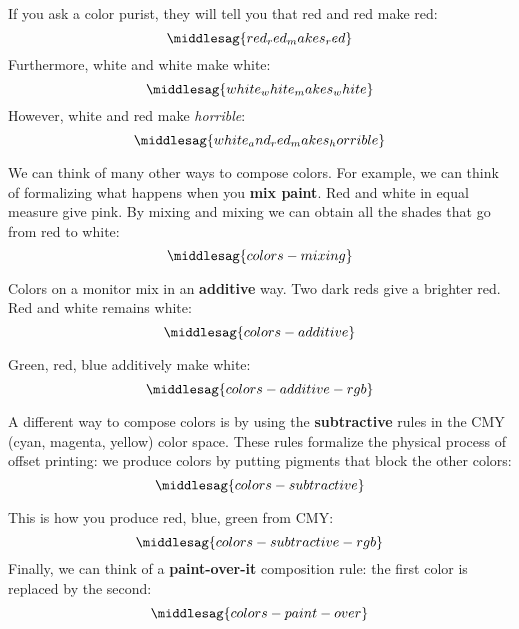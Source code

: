 If you ask a color purist, they will tell you that red and red make red:
%
\begin{equation}
    \middlesag{red_red_makes_red}
\end{equation}
%
Furthermore, white and white make white:
%
\begin{equation}
    \middlesag{white_white_makes_white}
\end{equation}
%
However, white and red make \emph{horrible}:
%
\begin{equation}
    \middlesag{white_and_red_makes_horrible}
\end{equation}


We can think of many other ways to compose colors.
For example, we can think of formalizing what happens when you \textbf{mix paint}.
Red and white in equal measure give pink.
By mixing and mixing we can obtain all the shades that go from red to white:
%
\begin{equation}
    \label{eq:colors-mixing}
    \middlesag{colors-mixing}
\end{equation}

Colors on a monitor mix in an \textbf{additive} way.
Two dark reds give a brighter red.
Red and white remains white:
%
\begin{equation}
    \label{eq:colors-additive}
    \middlesag{colors-additive}
\end{equation}

Green, red, blue additively make white:
%
\begin{equation}
    \label{eq:colors-additive-rgb}
    \middlesag{colors-additive-rgb}
\end{equation}

A different way to compose colors is by using the \textbf{subtractive} rules in the CMY (cyan, magenta, yellow) color space.
These rules formalize the physical process of offset printing: we produce colors by putting pigments that block the other colors:
%
\begin{equation}
    \label{eq:colors_subtractive}
    \middlesag{colors-subtractive}
\end{equation}

This is how you produce red, blue, green from CMY:
%
\begin{equation}
    \label{eq:colors-subtractive-rgb}
    \middlesag{colors-subtractive-rgb}
\end{equation}
%
Finally, we can think of a \textbf{paint-over-it} composition rule: the first color is replaced by the second:
%
\begin{equation}
    \label{eq:colors-paint-over}
    \middlesag{colors-paint-over}
\end{equation}